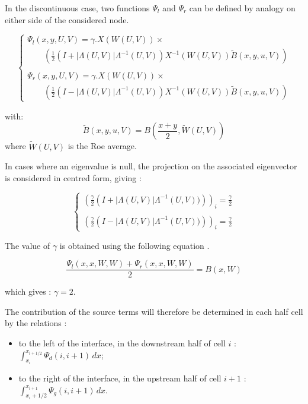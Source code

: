 In the discontinuous case, two functions $\Psi_l$ and $\Psi_r$ can be defined by analogy on either side of the considered node.

\begin{equation}
\left \lbrace
  \begin{array}{l}
    \Psi_l (x,y,U,V) = \gamma . X(W(U,V)) \times \\
    \qquad \left ( \frac{1}{2} ( I + |\Lambda(U,V)|\Lambda^{-1}(U,V) ) X^{-1}(W(U,V)) \tilde{B} (x,y,u,V) \right ) \\
    \\
    \Psi_r (x,y,U,V) = \gamma . X(W(U,V)) \times \\
    \qquad \left ( \frac{1}{2} ( I - |\Lambda(U,V)|\Lambda^{-1}(U,V) ) X^{-1}(W(U,V)) \tilde{B} (x,y,u,V) \right )
  \end{array}
 \right.
\end{equation}

with:
\begin{equation}
 \tilde{B} (x,y,u,V) = B(\frac{x+y}{2},\tilde{W}(U,V))
\end{equation}
where $\tilde{W}(U,V)$ is the Roe average.

In cases where an eigenvalue is null, the projection on the associated eigenvector is considered in centred form, giving :

\begin{equation}
\left \lbrace
  \begin{array}{l}
    \left ( \frac{\gamma}{2} \left ( I + |\Lambda(U,V)|\Lambda^{-1}(U,V)) \right ) \right )_i = \frac{\gamma}{2} \\
    \\
    \left ( \frac{\gamma}{2} \left ( I - |\Lambda(U,V)|\Lambda^{-1}(U,V)) \right ) \right )_i = \frac{\gamma}{2}
  \end{array}
 \right.
\end{equation}

The value of $\gamma$ is obtained using the following equation \cite{VAZQUEZ94}.

\begin{equation}
 \frac{\Psi_l (x,x,W,W) + \Psi_r (x,x,W,W)}{2} = B(x,W)
\end{equation}

which gives : $\gamma = 2$.

The contribution of the source terms will therefore be determined in each half cell by the relations :
\begin{itemize}
 \item to the left of the interface, in the downstream half of cell $i$ :  \\ $\int_{x_i}^{x_{i+1/2}} \Psi_d (i,i+1)\, dx$;
 \item to the right of the interface, in the upstream half of cell $i+1$ : \\ $\int_{x_i+1/2}^{x_{i+1}} \Psi_g (i,i+1)\, dx$.
\end{itemize}


